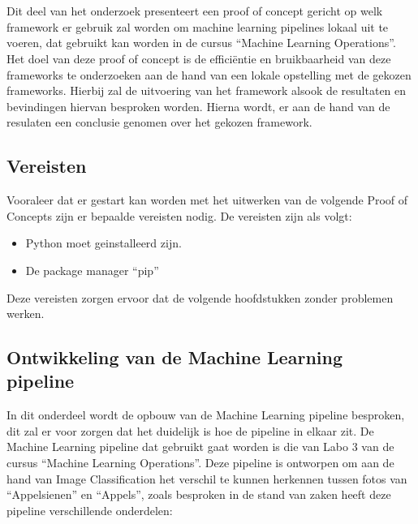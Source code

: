 \chapter{}%
\label{ch:PoC}

Dit deel van het onderzoek presenteert een proof of concept gericht op welk framework er gebruik zal worden om machine learning pipelines lokaal uit te voeren, dat gebruikt kan worden in de cursus ``Machine Learning Operations''.
Het doel van deze proof of concept is de efficiëntie en bruikbaarheid van deze frameworks te onderzoeken aan de hand van een lokale opstelling met de gekozen frameworks. Hierbij zal de uitvoering van het framework alsook de resultaten en bevindingen hiervan besproken worden.
Hierna wordt, er aan de hand van de resulaten een conclusie genomen over het gekozen framework.
\section{Vereisten}


Vooraleer dat er gestart kan worden met het uitwerken van de volgende Proof of Concepts zijn er bepaalde vereisten nodig.
De vereisten zijn als volgt:
\begin{itemize}
    \item Python moet geinstalleerd zijn.
    \item De package manager ``pip''
\end{itemize}
Deze vereisten zorgen ervoor dat de volgende hoofdstukken zonder problemen werken.
\section{Ontwikkeling van de Machine Learning pipeline}

In dit onderdeel wordt de opbouw van de Machine Learning pipeline besproken, dit zal er voor zorgen dat het duidelijk is hoe de pipeline in elkaar zit.
De Machine Learning pipeline dat gebruikt gaat worden is die van Labo 3 van de cursus ``Machine Learning Operations''. Deze pipeline is ontworpen om aan de hand van Image Classification het verschil te kunnen herkennen tussen fotos van ``Appelsienen'' en ``Appels'', zoals besproken in de stand van zaken heeft deze pipeline verschillende onderdelen:

